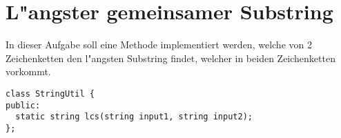 \documentclass[a4paper,10pt]{article}
\begin{document}
\section{L"angster gemeinsamer Substring}
In dieser Aufgabe soll eine Methode implementiert werden, welche von 2 Zeichenketten den l"angsten
Substring findet, welcher in beiden Zeichenketten vorkommt.

\vspace{3mm}

\begin{lstlisting}
class StringUtil {
public:
  static string lcs(string input1, string input2);
};
\end{lstlisting}
\end{document}
